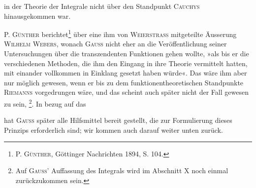 in der Theorie der Integrale nicht über den Standpunkt \textsc{Cauchys} hinausgekommen
war.
\par
\setcounter{footnote}{216}
P. \textsc{Günther} berichtet\footnote{P. \textsc{Günther}, Göttinger Nachrichten 1894, S. 104.} über eine ihm von \textsc{Weierstrass} mitgeteilte
Äusserung \textsc{Wilhelm Webers}, wonach \textsc{Gauss} nicht eher an die Veröffentlichung
seiner Untersuchungen über die transzendenten Funktionen gehen wollte, »als
bis er die verschiedenen Methoden, die ihm den Eingang in ihre Theorie vermittelt
hatten, mit einander vollkommen in Einklang gesetzt haben würde«.
Das wäre ihm aber nur möglich gewesen, wenn er bis zu dem funktionentheoretischen
Standpunkte \textsc{Riemanns} vorgedrungen wäre, und das scheint auch
später nicht der Fall gewesen zu sein, \footnote{Auf \textsc{Gauss'} Auffassung des Integrals wird im Abschnitt X noch einmal zurückzukommen sein.}. In bezug auf das\par
{}
\clearpage{}
\noindent {} hat \textsc{Gauss} später alle Hilfsmittel
bereit gestellt, die zur Formulierung dieses Prinzips erforderlich sind; wir
kommen auch darauf weiter unten zurück.\par

